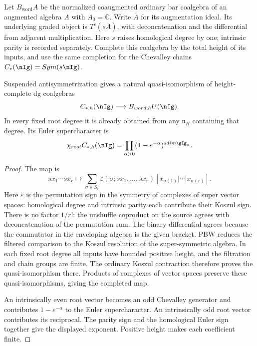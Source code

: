 Let \(B_{\mathrm{word}}A\) be the normalized coaugmented
ordinary bar coalgebra of an augmented algebra $A$ with $A_0=\mathbb C$.
Write $\overline A$ for its augmentation ideal. Its underlying graded object is
\(T^c(s\overline A)\), with deconcatenation and the differential
from adjacent multiplication. Here \(s\) raises homological
degree by one; intrinsic parity is recorded separately.
Complete this coalgebra by the total height of its inputs, and use
the same completion for the Chevalley chains
\(C_*(\nIg)=\operatorname{Sym}(s\nIg)\).

\begin{theorem}
\label{comp:thm:positive-bar}
Suspended antisymmetrization gives a natural quasi-isomorphism
of height-complete dg coalgebras
\[
 \widehat C_{*,h}(\nIg)\longrightarrow
 \widehat B_{\mathrm{word},h}U(\nIg).
\]
In every fixed root degree it is already obtained from any
\(\mathfrak n_H\) containing that degree. Its Euler
supercharacter is
\[
 \chi_{\mathrm{root}}\widehat C_{*,h}(\nIg)
 =\prod_{\alpha>0}(1-e^{-\alpha})^{\operatorname{sdim}\gIg_\alpha}.
\]
\end{theorem}
\begin{proof}
The map is
\[
 sx_1\cdots sx_r\longmapsto
 \sum_{\sigma\in S_r}\varepsilon(\sigma;sx_1,\ldots,sx_r)
 [x_{\sigma(1)}|\cdots|x_{\sigma(r)}].
\]
Here $\varepsilon$ is the permutation sign in the symmetry of
complexes of super vector spaces: homological degree and intrinsic
parity each contribute their Koszul sign. There is no factor \(1/r!\): the unshuffle coproduct on the
source agrees with deconcatenation of the permutation sum. The
binary differential agrees because the commutator in the enveloping
algebra is the given bracket. PBW reduces the filtered comparison
to the Koszul resolution of the super-symmetric algebra.
In each fixed root degree all inputs have bounded positive height,
and the filtration and chain groups are finite. The ordinary
Koszul contraction therefore proves the quasi-isomorphism there.
Products of complexes of vector spaces preserve these
quasi-isomorphisms, giving the completed map.

An intrinsically even root vector becomes an odd Chevalley generator
and contributes \(1-e^{-\alpha}\) to the Euler supercharacter.
An intrinsically odd root vector contributes its reciprocal.
The parity sign and the homological Euler sign together give the
displayed exponent. Positive height makes each coefficient finite.
\end{proof}


